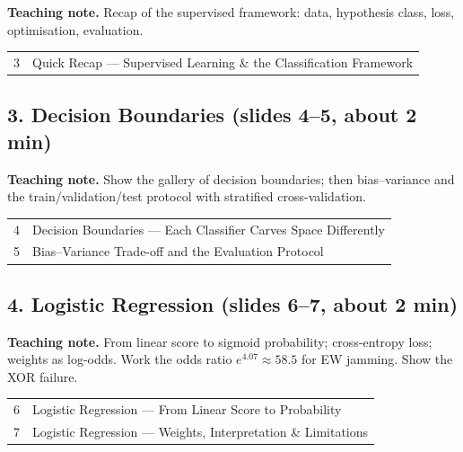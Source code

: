 \documentclass[11pt]{article}
\begin{document}
\textbf{Teaching note.} Recap of the supervised framework: data, hypothesis class, loss, optimisation, evaluation.

\begin{center}\small\renewcommand{\arraystretch}{1.1}\begin{tabularx}{\textwidth}{@{}r X@{}}3 & Quick Recap --- Supervised Learning \& the Classification Framework\\\end{tabularx}\end{center}

\subsection{3. Decision Boundaries \normalfont\small\color{GreyN}(slides 4--5, about 2 min)}

\textbf{Teaching note.} Show the gallery of decision boundaries; then bias--variance and the train/validation/test protocol with stratified cross-validation.

\begin{center}\small\renewcommand{\arraystretch}{1.1}\begin{tabularx}{\textwidth}{@{}r X@{}}4 & Decision Boundaries --- Each Classifier Carves Space Differently\\
5 & Bias--Variance Trade-off and the Evaluation Protocol\\\end{tabularx}\end{center}

\subsection{4. Logistic Regression \normalfont\small\color{GreyN}(slides 6--7, about 2 min)}

\textbf{Teaching note.} From linear score to sigmoid probability; cross-entropy loss; weights as log-odds. Work the odds ratio $e^{4.07}\approx58.5$ for EW jamming. Show the XOR failure.

\begin{center}\small\renewcommand{\arraystretch}{1.1}\begin{tabularx}{\textwidth}{@{}r X@{}}6 & Logistic Regression --- From Linear Score to Probability\\
7 & Logistic Regression --- Weights, Interpretation \& Limitations\\\end{tabularx}\end{center}
\end{document}
